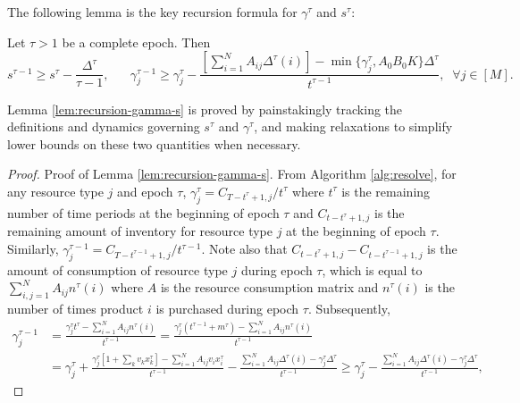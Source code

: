 \documentclass[opre]{informs3aa}
\begin{document}
The following lemma is the key recursion formula for $\gamma^\tau$ and $s^\tau$:
\begin{lemma}
Let $\tau>1$ be a complete epoch. Then
$$
s^{\tau-1} \geq s^\tau - \frac{\Delta^\tau}{\tau-1},\;\;\;\;\;\; \gamma^{\tau-1}_j \geq \gamma^\tau_j- \frac{[\sum_{i=1}^NA_{ij}\Delta^\tau(i)]-\min\{\gamma_j^\tau,A_0B_0K\}\Delta^\tau}{t^{\tau-1}},\;\;\forall j\in[M].
$$
\label{lem:recursion-gamma-s}
\end{lemma}

{Lemma \ref{lem:recursion-gamma-s} is proved by painstakingly tracking the definitions and dynamics governing $s^\tau$ and $\gamma^\tau$,
and making relaxations to simplify lower bounds on these two quantities when necessary.}

\begin{proof}{Proof of Lemma \ref{lem:recursion-gamma-s}.}
{From Algorithm \ref{alg:resolve}, for any resource type $j$ and epoch $\tau$, $\gamma_j^{\tau}=C_{T-t^{\tau}+1,j}/t^{\tau}$
where $t^{\tau}$ is the remaining number of time periods at the beginning of epoch $\tau$ and $C_{t-t^{\tau}+1,j}$ is the remaining amount of inventory for resource type $j$ at the beginning of epoch $\tau$. Similarly, $\gamma_j^{\tau-1}=C_{T-t^{\tau-1}+1,j}/t^{\tau-1}$. 
Note also that $C_{t-t^{\tau}+1,j}-C_{t-t^{\tau-1}+1,j}$ is the amount of consumption of resource type $j$ during epoch $\tau$,
which is equal to $\sum_{i,j=1}^NA_{ij}n^\tau(i)$ where $A$ is the resource consumption matrix and $n^\tau(i)$ is the number of times product $i$ is purchased during epoch $\tau$. Subsequently, }
\begin{align*}
\gamma^{\tau-1}_j &= \frac{\gamma^\tau_jt^\tau - \sum_{i=1}^NA_{ij}n^\tau(i)}{t^{\tau-1}} = \frac{\gamma^\tau_j(t^{\tau-1}+m^\tau)-\sum_{i=1}^NA_{ij}n^\tau(i)}{t^{\tau-1}}\\
&= \gamma^\tau_j + \frac{\gamma^\tau_j[1+\sum_k v_kx^\tau_k] - \sum_{i=1}^N A_{ij}v_ix^\tau_i}{t^{\tau-1}} - \frac{\sum_{i=1}^NA_{ij}\Delta^\tau(i)-\gamma_j^\tau\Delta^\tau}{t^{\tau-1}}\geq \gamma^\tau_j - \frac{\sum_{i=1}^NA_{ij}\Delta^\tau(i)-\gamma_j^\tau\Delta^\tau}{t^{\tau-1}},
\end{align*}

\end{proof}
\end{document}
